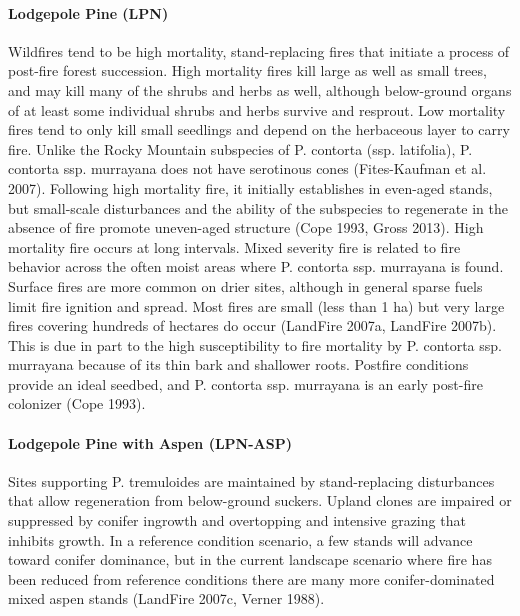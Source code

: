 \paragraph{Lodgepole Pine (LPN)} 	Wildfires tend to be high mortality, stand-replacing fires that initiate a process of post-fire forest succession. High mortality fires kill large as well as small trees, and may kill many of the shrubs and herbs as well, although below-ground organs of at least some individual shrubs and herbs survive and resprout. Low mortality fires tend to only kill small seedlings and depend on the herbaceous layer to carry fire.
	Unlike the Rocky Mountain subspecies of P. contorta (ssp. latifolia), P. contorta ssp. murrayana does not have serotinous cones (Fites-Kaufman et al. 2007). Following high mortality fire, it initially establishes in even-aged stands, but small-scale disturbances and the ability of the subspecies to regenerate in the absence of fire promote uneven-aged structure (Cope 1993, Gross 2013).
High mortality fire occurs at long intervals. Mixed severity fire is related to fire behavior across the often moist areas where P. contorta ssp. murrayana is found. Surface fires are more common on drier sites, although in general sparse fuels limit fire ignition and spread. Most fires are small (less than 1 ha) but very large fires covering hundreds of hectares do occur (LandFire 2007a, LandFire 2007b). This is due in part to the high susceptibility to fire mortality by P. contorta ssp. murrayana because of its thin bark and shallower roots. Postfire conditions provide an ideal seedbed, and P. contorta ssp. murrayana is an early post-fire colonizer (Cope 1993).

\paragraph{Lodgepole Pine with Aspen (LPN-ASP)}			Sites supporting P. tremuloides are maintained by stand-replacing disturbances that allow regeneration from below-ground suckers. Upland clones are impaired or suppressed by conifer ingrowth and overtopping and intensive grazing that inhibits growth. In a reference condition scenario, a few stands will advance toward conifer dominance, but in the current landscape scenario where fire has been reduced from reference conditions there are many more conifer-dominated mixed aspen stands (LandFire 2007c, Verner 1988). 

